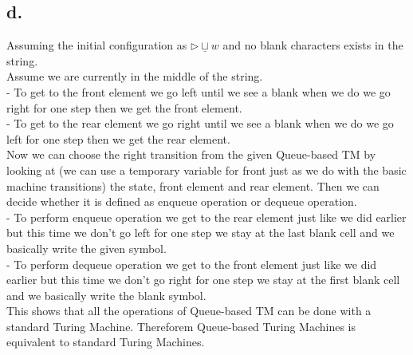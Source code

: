\documentclass[12pt]{article}
\begin{document}
\subsection*{d.}
Assuming the initial configuration as $\triangleright \underline{\sqcup}w$ and no blank characters exists in the string. \\ 
Assume we are currently in the middle of the string. \\
- To get to the front element we go left until we see a blank when we do we go right for one step then we get the front element. \\
- To get to the rear element we go right until we see a blank when we do we go left for one step then we get the rear element. \\
Now we can choose the right transition from the given Queue-based TM by looking at (we can use a temporary variable for front just as we do with the basic machine transitions) the state, front element and rear element. Then we can decide whether it is defined as enqueue operation or dequeue operation. \\
- To perform enqueue operation we get to the rear element just like we did earlier but this time we don't go left for one step we stay at the last blank cell and we basically write the given symbol. \\
- To perform dequeue operation we get to the front element just like we did earlier but this time we don't go right for one step we 
stay at the first blank cell and we basically write the blank symbol. \\   
This shows that all the operations of Queue-based TM can be done with a standard Turing Machine. Thereforem Queue-based Turing Machines is equivalent to standard Turing Machines.
\end{document}
